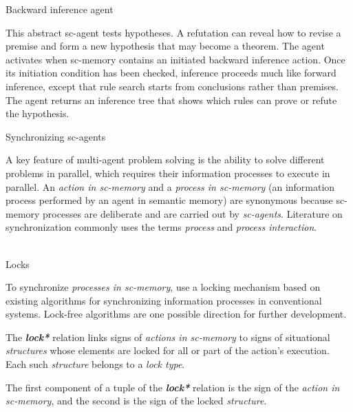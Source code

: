 
\begin{frame}{Backward inference agent}
\topline
\justifying
\vspace{10mm}

  This abstract sc-agent tests hypotheses. A refutation can reveal how to revise a premise and form a new hypothesis that may become a theorem. The agent activates when sc-memory contains an initiated backward inference action. Once its initiation condition has been checked, inference proceeds much like forward inference, except that rule search starts from conclusions rather than premises. The agent returns an inference tree that shows which rules can prove or refute the hypothesis.
\end{frame}

\begin{frame}{Synchronizing sc-agents}
\topline
\justifying
\vspace{10mm}

    A key feature of multi-agent problem solving is the ability to solve different problems in parallel, which requires their information processes to execute in parallel.
    An \textit{action in sc-memory} and a \textit{process in sc-memory} (an information process performed by an agent in semantic memory) are synonymous because sc-memory processes are deliberate and are carried out by \textit{sc-agents}. Literature on synchronization commonly uses the terms \textit{process} and \textit{process interaction}.
\end{frame}

\begin{frame}{\\Locks}
\topline
\justifying
\vspace{10mm}

To synchronize \textit{processes in sc-memory}, use a locking mechanism based on existing algorithms for synchronizing information processes in conventional systems. Lock-free algorithms are one possible direction for further development.

The \textbf{\textit{lock*}} relation links signs of \textit{actions in sc-memory} to signs of situational \textit{structures} whose elements are locked for all or part of the action's execution. Each such \textit{structure} belongs to a \textit{lock type}.

The first component of a tuple of the \textbf{\textit{lock*}} relation is the sign of the \textit{action in sc-memory}, and the second is the sign of the locked \textit{structure}.
\end{frame}

